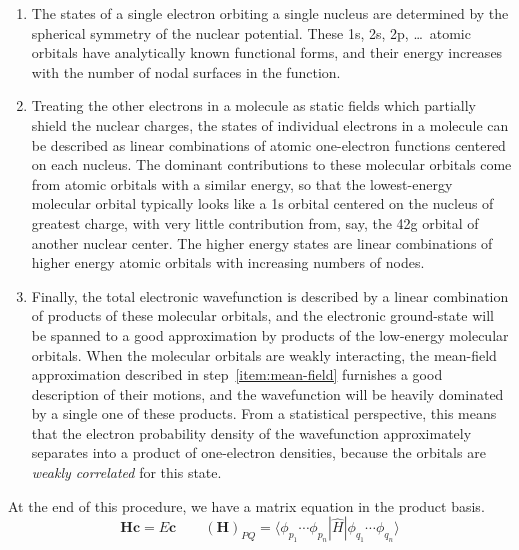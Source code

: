 \begin{enumerate}
    \item
        \label{item:atomic-orbitals}
        The states of a single electron orbiting a single nucleus are determined
        by the spherical symmetry of the nuclear potential.
        These 1s, 2s, 2p, \dots\ atomic orbitals have analytically known
        functional forms, and their energy increases with the number of nodal
        surfaces in the function.
    \item
        \label{item:mean-field}
        Treating the other electrons in a molecule as static fields which
        partially shield the nuclear charges, the states of individual electrons
        in a molecule can be described as linear combinations of atomic
        one-electron functions centered on each nucleus.
        The dominant contributions to these molecular orbitals come from atomic
        orbitals with a similar energy, so that the lowest-energy molecular
        orbital typically looks like a 1s orbital centered on the nucleus of
        greatest charge, with very little contribution from, say, the 42g
        orbital of another nuclear center.
        The higher energy states are linear combinations of higher energy atomic
        orbitals with increasing numbers of nodes.
    \item
        \label{item:full-ci}
        Finally, the total electronic wavefunction is described by a linear
        combination of products of these molecular orbitals, and the electronic
        ground-state will be spanned to a good approximation by products of the
        low-energy molecular orbitals.
        When the molecular orbitals are weakly interacting, the mean-field
        approximation described in step~\ref{item:mean-field} furnishes a good
        description of their motions, and the wavefunction will be heavily
        dominated by a single one of these products.
        From a statistical perspective, this means that the electron probability
        density of the wavefunction approximately separates into a product of
        one-electron densities, because the orbitals are {\itshape weakly
        correlated} for this state.
\end{enumerate}
At the end of this procedure, we have a matrix equation in the product basis.
\begin{equation}
    \mathbf{H}\mathbf{c}
    =
    E\mathbf{c}
    \qquad
    (\mathbf{H})_{PQ}
    =
    \langle \phi_{p_1}\cdots \phi_{p_n}|
    \hat{H}
    |\phi_{q_1}\cdots \phi_{q_n} \rangle
\end{equation}
